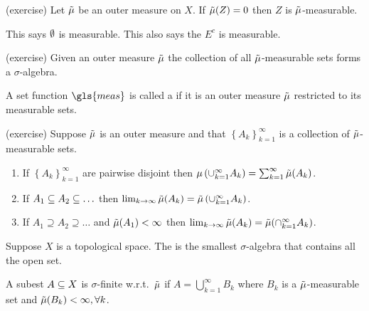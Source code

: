 \begin{prop}(exercise)
  Let $\tilde{\mu}$ be an outer measure on $X$. If $\tilde{\mu}(Z) = 0$ then $Z$ is
  $\tilde{\mu}$-measurable.
\end{prop}
\begin{note}
  This says $\emptyset$ is measurable. This also says the $E^c$ is
  measurable.
\end{note}
\begin{prop}
  (exercise) Given an outer measure $\tilde{\mu}$ the collection of all
  $\tilde{\mu}$-measurable sets forms a $\sigma$-algebra.
\end{prop}

\begin{defn}
  A set function $\gls{meas}$ is called a  if it is an outer measure $\tilde{\mu}$ restricted to its
  measurable sets.
\end{defn}

\begin{thm}(exercise)
  Suppose $\tilde{\mu}$ is an outer measure and that $\left\{ A_k
  \right\}_{k=1}^\infty$ is a collection of $\tilde{\mu}$-measurable sets.
  \begin{enumerate}
    \item If $\left\{ A_k\right\}_{k=1}^\infty$ are pairwise disjoint then
      $\mu\left( \cup_{k=1}^\infty A_k \right) =
      \sum_{k=1}^\infty\tilde{\mu}(A_k)$.
    \item If $A_1\subseteq A_2 \subseteq \ldots$ then
      $\lim_{k\to \infty}\tilde{\mu}(A_k) = \tilde{\mu}\left( \cup_{k=1}^\infty A_k
      \right)$.
    \item If $A_1 \supseteq A_2 \supseteq \ldots$ and $\tilde{\mu}(A_1) < \infty$ then
      $\lim_{k\to \infty}\tilde{\mu}(A_k) = \tilde{\mu}(\cap_{k=1}^\infty A_k)$.
  \end{enumerate}
\end{thm}

\begin{defn}
  Suppose $X$ is a topological space. The  is the smallest $\sigma$-algebra that contains all the
  open set.
\end{defn}

\begin{defn}
  A subest $A\subseteq X$ is $\sigma$-finite w.r.t.\ $\tilde{\mu}$ if
  $A=\bigcup_{k=1}^\infty B_k$ where $B_k$ is a $\tilde{\mu}$-measurable set and
  $\tilde{\mu}(B_k)<\infty, \forall k$.
\end{defn}

